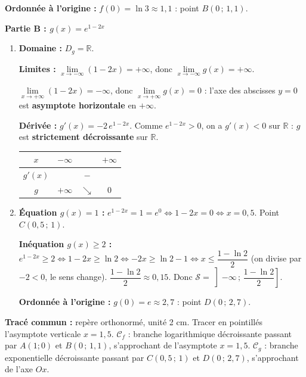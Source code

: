 \documentclass[11pt]{article}
\begin{document}
\begin{exoresolu}[Étude de $f(x)=\ln(3-2x)$ et $g(x)=e^{1-2x}$]
\begin{enumerate}
    \textbf{Ordonnée à l'origine :} $f(0)=\ln 3 \approx 1,1$ : point $B(0\,;\,1,1)$.
\end{enumerate}

\textbf{Partie B : $g(x) = e^{1-2x}$}
\begin{enumerate}
    \item \textbf{Domaine :} $D_g = \mathbb{R}$.

    \textbf{Limites :} $\lim\limits_{x\to -\infty} (1-2x) = +\infty$, donc $\lim\limits_{x\to -\infty} g(x) = +\infty$.

    $\lim\limits_{x\to +\infty} (1-2x) = -\infty$, donc $\lim\limits_{x\to +\infty} g(x) = 0$ : l'axe des abscisses $y=0$ est \textbf{asymptote horizontale} en $+\infty$.

    \textbf{Dérivée :} $g'(x) = -2\, e^{1-2x}$. Comme $e^{1-2x} > 0$, on a $g'(x) < 0$ sur $\mathbb{R}$ : $g$ est \textbf{strictement décroissante} sur $\mathbb{R}$.
    \begin{center}
    \begin{tabular}{|c|ccc|}\hline
    $x$ & $-\infty$ & & $+\infty$ \\ \hline
    $g'(x)$ & & $-$ & \\ \hline
    $g$ & $+\infty$ & $\searrow$ & $0$ \\ \hline
    \end{tabular}
    \end{center}
    \item \textbf{Équation $g(x)=1$ :} $e^{1-2x}=1=e^0 \iff 1-2x=0 \iff x=0,5$. Point $C(0,5\,;\,1)$.

    \textbf{Inéquation $g(x)\geqslant 2$ :} $e^{1-2x} \geqslant 2 \iff 1-2x \geqslant \ln 2 \iff -2x \geqslant \ln 2 - 1 \iff x \leqslant \dfrac{1-\ln 2}{2}$ (on divise par $-2<0$, le sens change). $\dfrac{1-\ln 2}{2}\approx 0,15$. Donc $\mathcal{S} = \left]-\infty\,;\, \dfrac{1-\ln 2}{2}\right]$.

    \textbf{Ordonnée à l'origine :} $g(0)=e \approx 2,7$ : point $D(0\,;\,2,7)$.
\end{enumerate}

\textbf{Tracé commun :} repère orthonormé, unité 2 cm. Tracer en pointillés l'asymptote verticale $x=1,5$. $\mathcal{C}_f$ : branche logarithmique décroissante passant par $A(1;0)$ et $B(0\,;\,1,1)$, s'approchant de l'asymptote $x=1,5$. $\mathcal{C}_g$ : branche exponentielle décroissante passant par $C(0,5\,;\,1)$ et $D(0\,;\,2,7)$, s'approchant de l'axe $Ox$.


\end{exoresolu}
\end{document}
